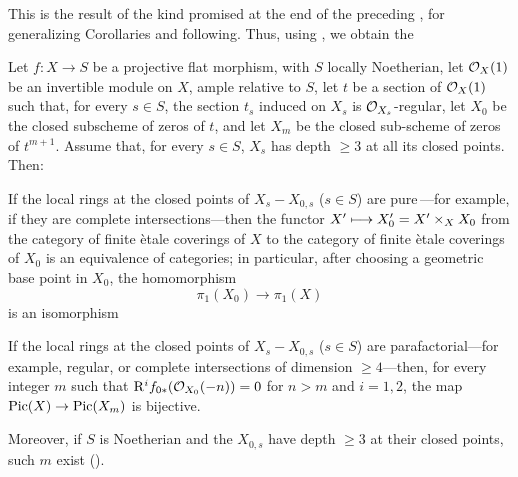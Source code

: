 This is the result of the kind promised at the end of the preceding , for generalizing Corollaries  and following. Thus, using , we obtain the

\begin{corollaire} \label{XII.4.9}
Let $f:X\to S$ be a projective flat morphism, with $S$ locally Noetherian, let $\mathcal O_X(1)$ be an invertible module on $X$, ample relative to $S$, let $t$ be a section of $\mathcal O_X(1)$ such that, for every $s\in S$, the section $t_s$ induced on $X_s$ is $\mathcal O_{X_s}$-regular, let $X_0$ be the closed subscheme of zeros of $t$, and let $X_m$ be the closed sub-scheme of zeros of $t^{m+1}$. Assume that, for every $s\in S$, $X_s$ has depth $\geq 3$ at all its closed points. Then:
\begin{enumeratea}
\item
If the local rings at the closed points of $X_s-X_{0,s}$ ($s\in S$) are \og pure\fg\,---for example, if they are complete intersections---then the functor $X'\longmapsto X_0'=X'\times_X X_0$ from the category of finite \`etale coverings of $X$ to the category of finite \`etale coverings of $X_0$ is an equivalence of categories; in particular, after choosing a geometric base point in $X_0$, the homomorphism
\[
\pi_1(X_0)\to \pi_1(X)
\]
is an isomorphism

\item
If the local rings at the closed points of $X_s-X_{0,s}$ ($s\in S$) are \og parafactorial\fg---for example, regular, or complete intersections of dimension $\geq 4$---then, for every integer $m$ such that $\mathrm R^if_{0\ast}(\mathcal O_{X_0}(-n))=0$ for $n>m$ and $i=1,2$, the map $\operatorname{Pic}(X)\to \operatorname{Pic}(X_m)$ is bijective.

Moreover, if $S$ is Noetherian and the $X_{0,s}$ have depth $\geq 3$ at their closed points, such $m$ exist (\cf {}).
\end{enumeratea}
\end{corollaire}

